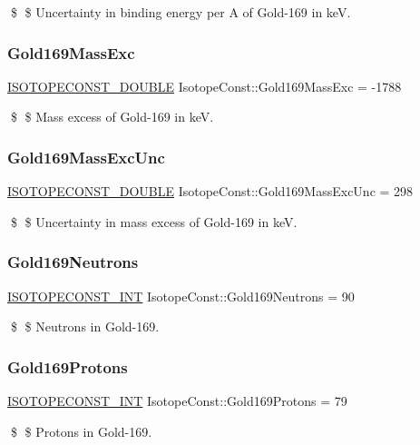 \$ \$ Uncertainty in binding energy per A of Gold-\/169 in keV. \mbox{\label{group___isotope_const-_gold-_au169_gae5dd3caaffc5e92e669c27a6a63ff399}} 
\subsubsection{\texorpdfstring{Gold169\+Mass\+Exc}{Gold169MassExc}}
{\footnotesize\ttfamily \mbox{\hyperlink{group___isotope_const-_macros_ga8f45a7272ce02c0b4c65c44636ed719a}{I\+S\+O\+T\+O\+P\+E\+C\+O\+N\+S\+T\+\_\+\+D\+O\+U\+B\+LE}} Isotope\+Const\+::\+Gold169\+Mass\+Exc = -\/1788}

\$ \$ Mass excess of Gold-\/169 in keV. \mbox{\label{group___isotope_const-_gold-_au169_ga090472391ca29d15e578045e8e368499}} 
\subsubsection{\texorpdfstring{Gold169\+Mass\+Exc\+Unc}{Gold169MassExcUnc}}
{\footnotesize\ttfamily \mbox{\hyperlink{group___isotope_const-_macros_ga8f45a7272ce02c0b4c65c44636ed719a}{I\+S\+O\+T\+O\+P\+E\+C\+O\+N\+S\+T\+\_\+\+D\+O\+U\+B\+LE}} Isotope\+Const\+::\+Gold169\+Mass\+Exc\+Unc = 298}

\$ \$ Uncertainty in mass excess of Gold-\/169 in keV. \mbox{\label{group___isotope_const-_gold-_au169_ga2fec4082956b1caeadfb2eba8e38cbb3}} 
\subsubsection{\texorpdfstring{Gold169\+Neutrons}{Gold169Neutrons}}
{\footnotesize\ttfamily \mbox{\hyperlink{group___isotope_const-_macros_ga5f18360b3e99483a35c32d789e62621c}{I\+S\+O\+T\+O\+P\+E\+C\+O\+N\+S\+T\+\_\+\+I\+NT}} Isotope\+Const\+::\+Gold169\+Neutrons = 90}

\$ \$ Neutrons in Gold-\/169. \mbox{\label{group___isotope_const-_gold-_au169_ga7517995325596df319279675a0a223ff}} 
\subsubsection{\texorpdfstring{Gold169\+Protons}{Gold169Protons}}
{\footnotesize\ttfamily \mbox{\hyperlink{group___isotope_const-_macros_ga5f18360b3e99483a35c32d789e62621c}{I\+S\+O\+T\+O\+P\+E\+C\+O\+N\+S\+T\+\_\+\+I\+NT}} Isotope\+Const\+::\+Gold169\+Protons = 79}

\$ \$ Protons in Gold-\/169. 